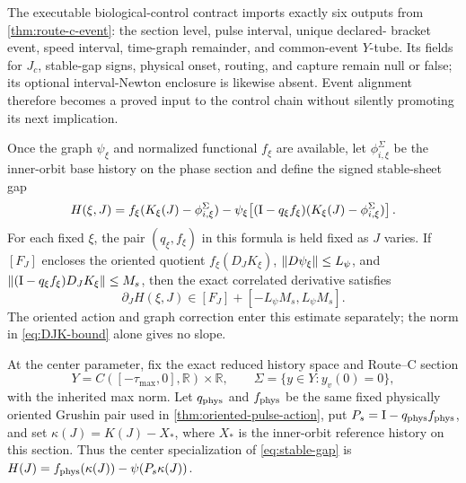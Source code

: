 The executable biological-control contract imports exactly six outputs from
\cref{thm:route-c-event}: the section level, pulse interval, unique declared-
bracket event, speed interval, time-graph remainder, and common-event
\(Y\)-tube.  Its fields for \(J_c\), stable-gap signs, physical onset,
routing, and capture remain null or false; its optional interval-Newton
enclosure is likewise absent.  Event alignment therefore becomes a proved
input to the control chain without silently promoting its next implication.

Once the graph \(\psi_\xi\) and normalized functional \(f_\xi\) are
available, let \(\phi_{i,\xi}^{\Sigma}\) be the inner-orbit base history on
the phase section and define the signed stable-sheet gap
\begin{equation}
 H(\xi,J)
 =f_\xi(K_\xi(J)-\phi_{i,\xi}^{\Sigma})
  -\psi_\xi\!\left[
   (\mathrm I-q_\xi f_\xi)
   (K_\xi(J)-\phi_{i,\xi}^{\Sigma})\right].           \label{eq:stable-gap}
\end{equation}
For each fixed \(\xi\), the pair \((q_\xi,f_\xi)\) in this formula is held
fixed as \(J\) varies.
If \([F_J]\) encloses the oriented quotient
\(f_\xi(D_JK_\xi)\), \(\left\lVert D\psi_\xi\right\rVert\le L_\psi\), and
\(\left\lVert(\mathrm I-q_\xi f_\xi)D_JK_\xi\right\rVert\le M_s\), then the exact correlated
derivative satisfies
\begin{equation}
\partial_JH(\xi,J)
\in[F_J]+[-L_\psi M_s,L_\psi M_s].                  \label{eq:gap-slope-budget}
\end{equation}
The oriented action and graph correction enter this estimate separately; the
norm in \cref{eq:DJK-bound} alone gives no slope.

At the center parameter, fix the exact reduced history space and Route--C
section
\[
 Y=C([-\tau_{\max},0],\mathbb R)\times\mathbb R,
 \qquad \Sigma=\{y\in Y:y_v(0)=0\},
\]
with the inherited max norm.  Let \(q_{\rm phys}\) and
\(f_{\rm phys}\) be the same fixed physically oriented Grushin pair used in
\cref{thm:oriented-pulse-action}, put
\(P_s=\mathrm I-q_{\rm phys}f_{\rm phys}\), and set
\(\kappa(J)=K(J)-X_*\), where \(X_*\) is the inner-orbit reference history
on this section.  Thus the center specialization of \cref{eq:stable-gap} is
\(H(J)=f_{\rm phys}(\kappa(J))-\psi(P_s\kappa(J))\).

